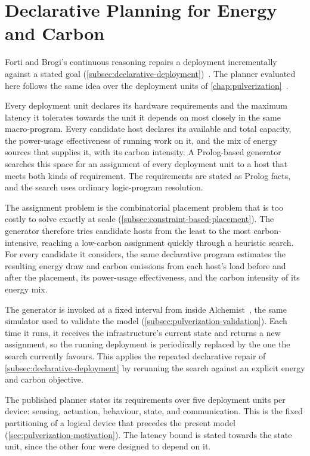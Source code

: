\section{Declarative Planning for Energy and Carbon}
\label{sec:declarative-green-planning}

Forti and Brogi's continuous reasoning repairs a deployment incrementally against a stated goal (\cref{subsec:declarative-deployment})~\cite{DBLP:journals/logcom/FortiBB22}.
%
The planner evaluated here follows the same idea over the deployment units of \cref{chap:pulverization}~\cite{DBLP:conf/coordination/BrogiCFFV25}.

Every deployment unit declares its hardware requirements and the maximum latency it tolerates towards the unit it depends on most closely in the same macro-program.
%
Every candidate host declares its available and total capacity, the power-usage effectiveness of running work on it, and the mix of energy sources that supplies it, with its carbon intensity.
%
A Prolog-based generator searches this space for an assignment of every deployment unit to a host that meets both kinds of requirement.
The requirements are stated as Prolog facts, and the search uses ordinary logic-program resolution.

The assignment problem is the combinatorial placement problem that is too costly to solve exactly at scale (\cref{subsec:constraint-based-placement}).
%
The generator therefore tries candidate hosts from the least to the most carbon-intensive, reaching a low-carbon assignment quickly through a heuristic search.
%
For every candidate it considers, the same declarative program estimates the resulting energy draw and carbon emissions
from each host's load before and after the placement, its power-usage effectiveness, and the carbon intensity of its energy mix.

The generator is invoked at a fixed interval from inside Alchemist~\cite{DBLP:journals/jos/PianiniMV13}, the same simulator used to validate the model (\cref{subsec:pulverization-validation}).
%
Each time it runs, it receives the infrastructure's current state and returns a new assignment,
so the running deployment is periodically replaced by the one the search currently favours.
%
This applies the repeated declarative repair of \cref{subsec:declarative-deployment} by rerunning the search against an explicit energy and carbon objective.

The published planner states its requirements over five deployment units per device: sensing, actuation, behaviour, state, and communication.
%
This is the fixed partitioning of a logical device that precedes the present model (\cref{sec:pulverization-motivation}).
%
The latency bound is stated towards the state unit, since the other four were designed to depend on it.

